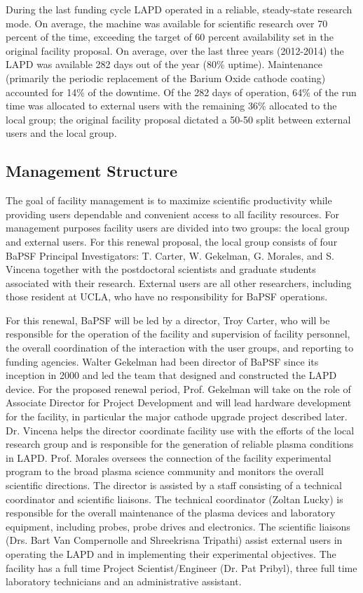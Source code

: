 \documentclass[11pt]{article}
\begin{document}
During the last funding cycle LAPD operated in a reliable, steady-state
research mode. On average, the machine was available for scientific
research over 70 percent of the time, exceeding the target of 60 percent
availability set in the original facility proposal. On average, over the
last three years (2012-2014) the LAPD was available 282 days out of the
year (80\% uptime). Maintenance (primarily the periodic replacement of
the Barium Oxide cathode coating) accounted for 14\% of the downtime. Of
the 282 days of operation, 64\% of the run time was allocated to
external users with the remaining 36\% allocated to the local group; the
original facility proposal dictated a 50-50 split between external
users and the local group.

\subsection{Management Structure}

The goal of facility management is to maximize scientific productivity
while providing users dependable and convenient access to all facility
resources. For management purposes facility users are divided into two
groups: the local group and external users. For this renewal proposal,
the local group consists of four BaPSF Principal Investigators: T.
Carter, W. Gekelman, G. Morales, and S. Vincena together with the
postdoctoral scientists and graduate students associated with their
research. External users are all other researchers, including those
resident at UCLA, who have no responsibility for BaPSF operations.

For this renewal, BaPSF will be led by a director, Troy Carter, who will
be responsible for the operation of the facility and supervision of
facility personnel, the overall coordination of the interaction with
the user groups, and reporting to funding agencies. Walter Gekelman
had been director of BaPSF since its inception in 2000 and led the
team that designed and constructed the LAPD device. For the proposed
renewal period, Prof. Gekelman will take on the role of Associate
Director for Project Development and will lead hardware development
for the facility, in particular the major cathode upgrade project
described later. Dr.  Vincena helps the director coordinate facility
use with the efforts of the local research group and is responsible
for the generation of reliable plasma conditions in
LAPD. Prof. Morales oversees the connection of the facility
experimental program to the broad plasma science community and
monitors the overall scientific directions. The director is assisted
by a staff consisting of a technical coordinator and scientific
liaisons. The technical coordinator (Zoltan Lucky) is responsible for
the overall maintenance of the plasma devices and laboratory
equipment, including probes, probe drives and electronics.  The
scientific liaisons (Drs. Bart Van Compernolle and Shreekrisna
Tripathi) assist external users in operating the LAPD and in
implementing their experimental objectives. The facility has a full
time Project Scientist/Engineer (Dr. Pat Pribyl), three full time
laboratory technicians and an administrative assistant.
\end{document}
